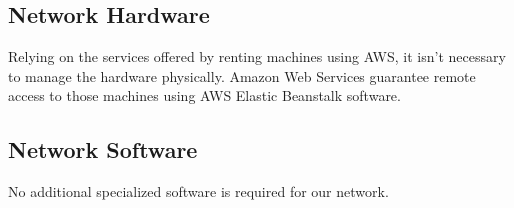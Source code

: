 \subsection{Network Hardware}
Relying on the services offered by renting machines using AWS, it isn’t necessary to manage the hardware physically. Amazon Web Services guarantee remote access to those machines using AWS Elastic Beanstalk software.

\subsection{Network Software}
No additional specialized software is required for our network.

\pagebreak 